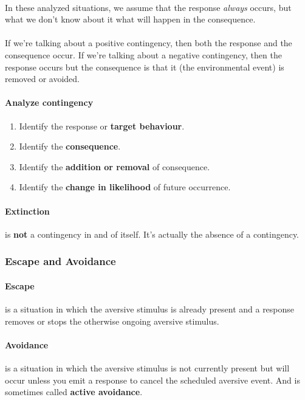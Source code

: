\documentclass{article}
\begin{document}
	\paragraph{} In these analyzed situations, we assume that the response \emph{always} occurs, but what we don't know about it what will happen in the consequence.
	\paragraph{} If we're talking about a positive contingency, then both the response and the consequence occur. If we're talking about a negative contingency, then the response occurs but the consequence is that it (the environmental event) is removed or avoided.
	\paragraph{Analyze contingency}
	\begin{enumerate}
		\item Identify the response or \textbf{target behaviour}.
		\item Identify the \textbf{consequence}.
		\item Identify the \textbf{addition or removal} of consequence.
		\item Identify the \textbf{change in likelihood} of future occurrence.
	\end{enumerate}
	\paragraph{Extinction} is \textbf{not} a contingency in and of itself. It's actually the absence of a contingency.
	\subsubsection{Escape and Avoidance}
	\paragraph{Escape} is a situation in which the aversive stimulus is already present and a response removes or stops the otherwise ongoing aversive stimulus.
	\paragraph{Avoidance} is a situation in which the aversive stimulus is not currently present but will occur unless you emit a response to cancel the scheduled aversive event. And is sometimes called \textbf{active avoidance}.
\end{document}

